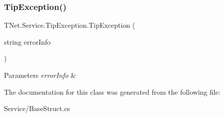 \subsubsection{\texorpdfstring{Tip\+Exception()}{TipException()}}
{\footnotesize\ttfamily T\+Net.\+Service.\+Tip\+Exception.\+Tip\+Exception (\begin{DoxyParamCaption}\item[{string}]{error\+Info }\end{DoxyParamCaption})}






\begin{DoxyParams}{Parameters}
{\em error\+Info} & \\
\hline
\end{DoxyParams}


The documentation for this class was generated from the following file\+:\begin{DoxyCompactItemize}
\item 
Service/Base\+Struct.\+cs\end{DoxyCompactItemize}
